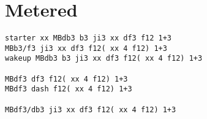 \documentclass[main.tex]{subfiles}
\begin{document}


\section{Metered}


\begin{lstlisting}[language=FG]
starter xx MBdb3 b3 ji3 xx df3 f12 1+3
MBb3/f3 ji3 xx df3 f12( xx 4 f12) 1+3
wakeup MBdb3 b3 ji3 xx df3 f12( xx 4 f12) 1+3

MBdf3 df3 f12( xx 4 f12) 1+3
MBdf3 dash f12( xx 4 f12) 1+3

MBdf3/db3 ji3 xx df3 f12( xx 4 f12) 1+3
\end{lstlisting}






\end{document}
